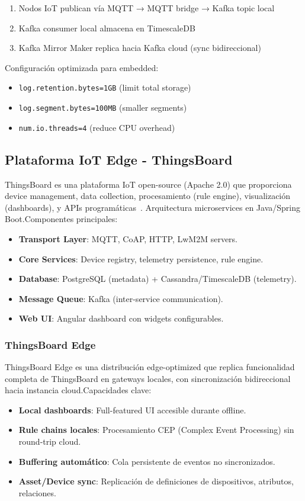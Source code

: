 \begin{enumerate}
\item Nodos IoT publican vía MQTT → MQTT bridge → Kafka topic local
\item Kafka consumer local almacena en TimescaleDB
\item Kafka Mirror Maker replica hacia Kafka cloud (sync bidireccional)
\end{enumerate}

Configuración optimizada para embedded:
\begin{itemize}
\item \texttt{log.retention.bytes=1GB} (limit total storage)
\item \texttt{log.segment.bytes=100MB} (smaller segments)
  \item \texttt{num.io.threads=4} (reduce CPU overhead)
\end{itemize}

\subsection{Plataforma IoT Edge - ThingsBoard}

ThingsBoard es una plataforma IoT open-source (Apache 2.0) que proporciona device management, data collection, procesamiento (rule engine), visualización (dashboards), y APIs programáticas~\cite{gartnerMagicQuadrantIoT2024}. Arquitectura microservices en Java/Spring Boot.Componentes principales:
\begin{itemize}
\item \textbf{Transport Layer}: MQTT, CoAP, HTTP, LwM2M servers.
\item \textbf{Core Services}: Device registry, telemetry persistence, rule engine.
\item \textbf{Database}: PostgreSQL (metadata) + Cassandra/TimescaleDB (telemetry).
\item \textbf{Message Queue}: Kafka (inter-service communication).
  \item \textbf{Web UI}: Angular dashboard con widgets configurables.
\end{itemize}

\subsubsection{ThingsBoard Edge}

ThingsBoard Edge es una distribución edge-optimized que replica funcionalidad completa de ThingsBoard en gateways locales, con sincronización bidireccional hacia instancia cloud.Capacidades clave:
\begin{itemize}
\item \textbf{Local dashboards}: Full-featured UI accesible durante offline.
\item \textbf{Rule chains locales}: Procesamiento CEP (Complex Event Processing) sin round-trip cloud.
\item \textbf{Buffering automático}: Cola persistente de eventos no sincronizados.
\item \textbf{Asset/Device sync}: Replicación de definiciones de dispositivos, atributos, relaciones.
\end{itemize}

